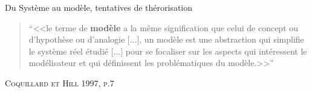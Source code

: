 \documentclass[newPxFont]{beamer}
\begin{document}
\begin{frame}[c]{Du Système au modèle, tentatives de thérorisation}
\vspace{-1em}
\begin{quote}
  \enquote{<<le terme de \textbf{modèle} a la même signification que celui de concept ou d'hypothèse ou d'analogie [...], un modèle est une abstraction qui simplifie le système réel étudié [...] pour se focaliser sur les aspects qui intéressent le modélisateur et qui définissent les problématiques du modèle.>>}
\end{quote}
\hspace*{\fill}\textsc{Coquillard et Hill 1997, p.7}
\vspace{-0.5em}
\begin{figure}
 	\centering
 		\hspace{0.2em}%
    \hspace{0.2em}%
 		\hspace{0.2em}%
\end{figure}
\end{frame}
\end{document}

